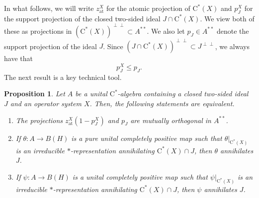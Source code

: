 \documentclass[10pt]{amsart}
\newcommand{\rC}{\mathrm{C}}
\newcommand{\at}{\operatorname{at}}
\newtheorem{proposition}[lemma]{Proposition}
\theoremstyle{definition}
\begin{document}
In what follows, we  will write $z^X_{\at}$ for the atomic projection of $\rC^*(X)$ and $p^X_J$ for the support projection of the closed two-sided ideal $J\cap \rC^*(X)$. We view  both of these as projections in $(\rC^*(X))^{\perp\perp}\subset A^{**}$. We also let  $p_J\in A^{**}$ denote the support projection of the ideal $J$. Since $(J\cap \rC^*(X))^{\perp\perp}\subset J^{\perp\perp}$, we always have that 
\begin{equation}\label{Eq:pJX}
p^X_J\leq p_J.
\end{equation}
The next result is a key technical tool.



\begin{proposition}\label{P:projzero}
Let $A$ be a unital $\rC^*$-algebra containing a closed two-sided ideal $J$ and an operator system $X$. 
Then, the following statements are equivalent.
\begin{enumerate}[{\rm (i)}]
\item The projections $z^X_{\at}(1-p^X_J)$ and $p_J$ are mutually orthogonal in $A^{**}$.
\item If $\theta:A\to B(H)$ is a pure unital completely positive map such that $\theta|_{\rC^*(X)}$ is an irreducible $*$-representation annihilating $\rC^*(X)\cap J$, then $\theta$ annihilates $J$.
\item If $\psi:A\to B(H)$ is a unital completely positive map such that $\psi|_{\rC^*(X)}$ is an irreducible $*$-representation annihilating $\rC^*(X)\cap J$, then $\psi$ annihilates $J$.
\end{enumerate}
\end{proposition}
\end{document}
